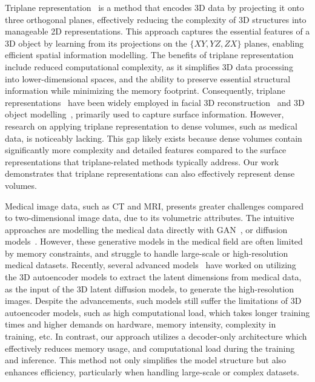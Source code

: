 \documentclass[letterpaper]{article} %
\begin{document}
Triplane representation~\cite{chan2022efficient} is a method that encodes 3D data by projecting it onto three orthogonal planes, effectively reducing the complexity of 3D structures into manageable 2D representations. This approach captures the essential features of a 3D object by learning from its projections on the $\{XY, YZ, ZX\}$ planes, enabling efficient spatial information modelling. The benefits of triplane representation include reduced computational complexity, as it simplifies 3D data processing into lower-dimensional spaces, and the ability to preserve essential structural information while minimizing the memory footprint. Consequently, triplane representations~\cite{chan2022efficient} have been widely employed in facial 3D reconstruction~\cite{chan2022efficient} and 3D object modelling~\cite{shue20233d}, primarily used to capture surface information. However, research on applying triplane representation to dense volumes, such as medical data, is noticeably lacking. This gap likely exists because dense volumes contain significantly more complexity and detailed features compared to the surface representations that triplane-related methods typically address. Our work demonstrates that triplane representations can also effectively represent dense volumes.

Medical image data, such as CT and MRI, presents greater challenges compared to two-dimensional image data, due to its volumetric attributes. The intuitive approaches are modelling the medical data directly with GAN~\cite{kwon2019generation,hong20213d,ozbey2020three,cirillo2021vox2vox}, or diffusion models~\cite{dorjsembe2022three}. However, these generative models in the medical field are often limited by memory constraints, and struggle to handle large-scale or high-resolution medical datasets. Recently, several advanced models~\cite{Pinaya2022BrainIG,Khader2022MedicalDD} have worked on utilizing the 3D autoencoder models to extract the latent dimensions from medical data, as the input of the 3D latent diffusion models, to generate the high-resolution images. Despite the advancements, such models still suffer the limitations of 3D autoencoder models, such as high computational load, which takes longer training times and higher demands on hardware, memory intensity, complexity in training, etc. In contrast, our approach utilizes a decoder-only architecture which effectively reduces memory usage, and computational load during the training and inference. This method not only simplifies the model structure but also enhances efficiency, particularly when handling large-scale or complex datasets.
\end{document}
